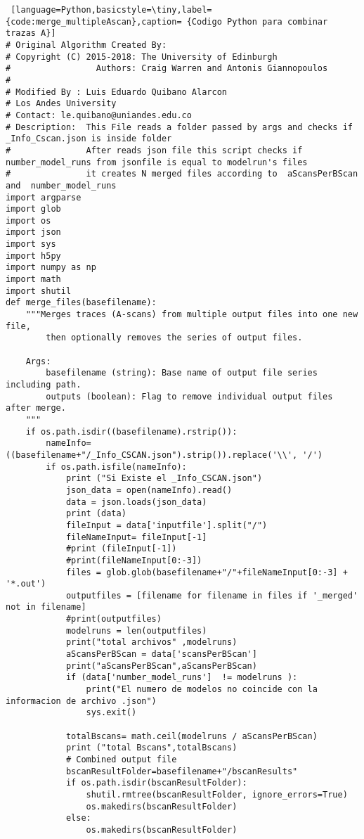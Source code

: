 \begin{lstlisting} [language=Python,basicstyle=\tiny,label={code:merge_multipleAscan},caption= {Codigo Python para combinar trazas A}]
# Original Algorithm Created By:
# Copyright (C) 2015-2018: The University of Edinburgh
#                 Authors: Craig Warren and Antonis Giannopoulos
#
# Modified By : Luis Eduardo Quibano Alarcon
# Los Andes University
# Contact: le.quibano@uniandes.edu.co
# Description:  This File reads a folder passed by args and checks if _Info_Cscan.json is inside folder
#               After reads json file this script checks if number_model_runs from jsonfile is equal to modelrun's files
#               it creates N merged files according to  aScansPerBScan and  number_model_runs
import argparse
import glob
import os
import json
import sys
import h5py
import numpy as np
import math
import shutil
def merge_files(basefilename):
    """Merges traces (A-scans) from multiple output files into one new file,
        then optionally removes the series of output files.

    Args:
        basefilename (string): Base name of output file series including path.
        outputs (boolean): Flag to remove individual output files after merge.
    """
    if os.path.isdir((basefilename).rstrip()):
        nameInfo= ((basefilename+"/_Info_CSCAN.json").strip()).replace('\\', '/')
        if os.path.isfile(nameInfo):
            print ("Si Existe el _Info_CSCAN.json")
            json_data = open(nameInfo).read()
            data = json.loads(json_data)
            print (data)
            fileInput = data['inputfile'].split("/")
            fileNameInput= fileInput[-1]
            #print (fileInput[-1])
            #print(fileNameInput[0:-3])
            files = glob.glob(basefilename+"/"+fileNameInput[0:-3] + '*.out')
            outputfiles = [filename for filename in files if '_merged' not in filename]
            #print(outputfiles)
            modelruns = len(outputfiles)
            print("total archivos" ,modelruns)
            aScansPerBScan = data['scansPerBScan']
            print("aScansPerBScan",aScansPerBScan)
            if (data['number_model_runs']  != modelruns ):
                print("El numero de modelos no coincide con la informacion de archivo .json")
                sys.exit()

            totalBscans= math.ceil(modelruns / aScansPerBScan)
            print ("total Bscans",totalBscans)
            # Combined output file
            bscanResultFolder=basefilename+"/bscanResults"
            if os.path.isdir(bscanResultFolder):
                shutil.rmtree(bscanResultFolder, ignore_errors=True)
                os.makedirs(bscanResultFolder)
            else:
                os.makedirs(bscanResultFolder)


\end{lstlisting}
